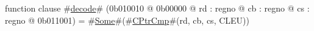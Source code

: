 function clause #\hyperref[zdecode]{decode}# (0b010010 @ 0b00000 @ rd : regno @ cb : regno @ cs : regno @ 0b011001) = #\hyperref[zSome]{Some}#(#\hyperref[zCPtrCmp]{CPtrCmp}#(rd, cb, cs, CLEU))
